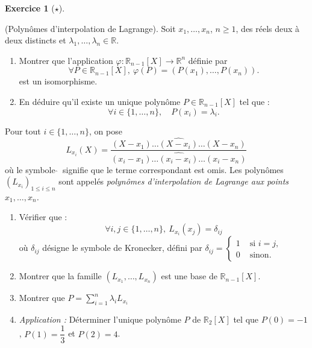 \documentclass[
  french,
  letterpaper,
  DIV=11,
  numbers=noendperiod]{scrreprt}
\theoremstyle{plain}
\theoremstyle{definition}
\theoremstyle{plain}
\theoremstyle{plain}
\theoremstyle{definition}
\newtheorem{exercise}{Exercice}[chapter]
\theoremstyle{definition}
\theoremstyle{plain}
\theoremstyle{remark}
\begin{document}
\begin{exercise}[\(\star\)]\protect\hypertarget{exr-03-interp}{}\label{exr-03-interp}

(Polynômes d'interpolation de Lagrange). Soit \(x_1,\dots,x_n\),
\(n\geqslant 1\), des réels deux à deux distincts et
\(\lambda_1,\dots,\lambda_n\in\mathbb{R}\).

\begin{enumerate}
\def\labelenumi{\arabic{enumi}.}
\item
  Montrer que l'application
  \(\varphi : \mathbb{R}_{n-1}[X]\to \mathbb{R}^{n}\) définie par
  \[\forall P\in\mathbb{R}_{n-1}[X],\ \varphi(P) = (P(x_1),\dots,P(x_n)).\]
  est un isomorphisme.
\item
  En déduire qu'il existe un unique polynôme \(P\in\mathbb{R}_{n-1}[X]\)
  tel que : \[\forall i\in\{1,\dots,n\},\quad P(x_i) = \lambda_i.\]
\end{enumerate}

Pour tout \(i\in\{1,\dots,n\}\), on pose
\[L_{x_i}(X) = \frac{(X-x_1)\dots \widehat{(X-x_i)}\dots (X-x_n)}{(x_i-x_1)\dots \widehat{(x_i - x_i)} \dots (x_i - x_n)}\]
où le symbole \(\widehat{}\ \) signifie que le terme correspondant est
omis. Les polynômes \((L_{x_i})_{1\leqslant i\leqslant n}\) sont appelés
\emph{polynômes d'interpolation de Lagrange aux points
\(x_1,\dots,x_n\).}

\begin{enumerate}
\def\labelenumi{\arabic{enumi}.}
\item
  Vérifier que :
  \[\forall i,j\in\{1,\dots,n\},\ L_{x_i}(x_j) = \delta_{ij}\] où
  \(\delta_{ij}\) désigne le symbole de Kronecker, défini par
  \(\delta_{ij} = \left\{\begin{array}{ll}
  1 &\text{ si $i=j$},\\
  0&\text{ sinon}.
  \end{array}\right.\)
\item
  Montrer que la famille \((L_{x_1},\dots,L_{x_n})\) est une base de
  \(\mathbb{R}_{n-1}[X]\).
\item
  Montrer que \(P = \sum_{i=1}^n \lambda_i L_{x_i}\)
\item
  \emph{Application :} Déterminer l'unique polynôme \(P\) de
  \(\mathbb{R}_2[X]\) tel que \(P(0) = -1\), \(P(1) = \dfrac{1}{3}\) et
  \(P(2) = 4\).
\end{enumerate}

\end{exercise}

\end{document}
